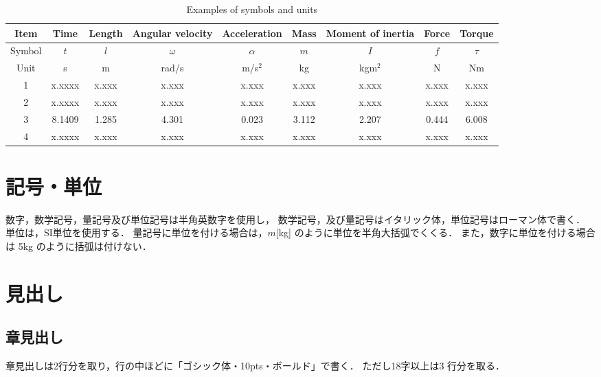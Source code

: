 \documentclass[a4jsme]{jsmepaper}
\begin{document}
\begin{table}[htbp]
  \setcounter{table}{1}
  \begin{center}
  \caption{Examples of symbols and units}
  \label{tbl:units}
  \begin{tabular}{c||c|c|c|c|c|c|c|c}\hline
    Item   & Time    & Length  & Angular velocity & Acceleration & Mass  & Moment of inertia & Force & Torque   \\\hline
    Symbol & $t$     & $l$     & $\omega$         & $\alpha$     & $m$   & $I$               & $f$   & $\tau$   \\\hline
    Unit   & s       & m       & rad/s            & m/s$^2$      & kg    & kgm$^2$           & N     & Nm       \\\hline
    1      & x.xxxx  & x.xxx   & x.xxx            & x.xxx        & x.xxx & x.xxx             & x.xxx & x.xxx    \\\hline
    2      & x.xxxx  & x.xxx   & x.xxx            & x.xxx        & x.xxx & x.xxx             & x.xxx & x.xxx    \\\hline
    3      & 8.1409  & 1.285   & 4.301            & 0.023        & 3.112 & 2.207             & 0.444 & 6.008    \\\hline
    4      & x.xxxx  & x.xxx   & x.xxx            & x.xxx        & x.xxx & x.xxx             & x.xxx & x.xxx    \\\hline
  \end{tabular}
  \end{center}
\end{table}

\section{記号・単位}
数字，数学記号，量記号及び単位記号は半角英数字を使用し，
数学記号，及び量記号はイタリック体，単位記号はローマン体で書く．
単位は，SI単位を使用する．
量記号に単位を付ける場合は，$m$[kg] のように単位を半角大括弧でくくる．
また，数字に単位を付ける場合は 5kg のように括弧は付けない．

\section{見出し}
\subsection{章見出し}
章見出しは2行分を取り，行の中ほどに「ゴシック体・10pts・ボールド」で書く．
ただし18字以上は3 行分を取る．
\end{document}
